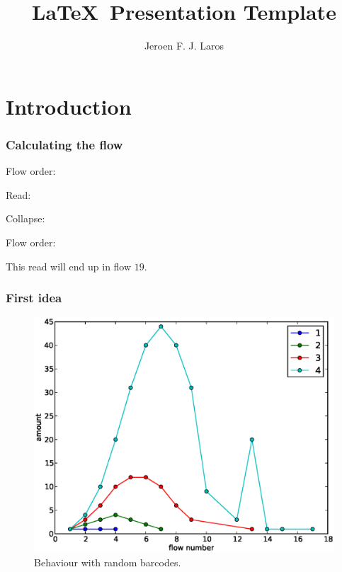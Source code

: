 \documentclass[slidestop]{beamer}
\title{\LaTeX\ Presentation Template}
\author{Jeroen F. J. Laros}
\begin{document}

\bodytemplate

\section{Introduction}
\begin{frame}
  \frametitle{Calculating the flow}

  Flow order: 

  Read: 
  \bigskip
  \pause

  Collapse: 
  \bigskip
  \pause

  Flow order: 

  This read will end up in flow $19$.
\end{frame}

\begin{frame}
  \frametitle{First idea}

  \begin{figure}[]
    \begin{center}
      \includegraphics[height=0.9\textheight]{random}
    \end{center}
    \caption{Behaviour with random barcodes.}
    \label{}
  \end{figure}
\end{frame}
\end{document}
